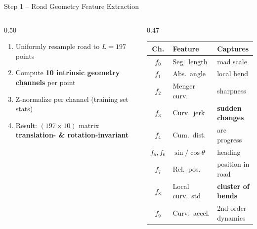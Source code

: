 \documentclass[aspectratio=169,10pt]{beamer}
\newcommand{\hl}[1]{\textcolor{mLightBrown}{\textbf{#1}}}
\begin{document}
\begin{frame}{Step 1 -- Road Geometry Feature Extraction}
  \begin{columns}[T]
    \begin{column}{0.50\linewidth}
      \begin{enumerate}
        \item Uniformly resample road to $L{=}197$ points
        \item Compute \textbf{10 intrinsic geometry channels} per point
        \item Z-normalize per channel (training set stats)
        \item Result: $(197{\times}10)$ matrix\\
              \textbf{translation- \& rotation-invariant}
      \end{enumerate}
    \end{column}
    \begin{column}{0.47\linewidth}
      \small
      \begin{tabular}{@{}cll@{}}
        \toprule
        \textbf{Ch.} & \textbf{Feature} & \textbf{Captures} \\
        \midrule
        $f_0$ & Seg.\ length    & road scale \\
        $f_1$ & Abs.\ angle     & local bend \\
        $f_2$ & Menger curv.    & sharpness \\
        $f_3$ & Curv.\ jerk     & \hl{sudden changes} \\
        $f_4$ & Cum.\ dist.     & arc progress \\
        $f_5,f_6$ & $\sin/\cos\theta$ & heading \\
        $f_7$ & Rel.\ pos.      & position in road \\
        $f_8$ & Local curv.\ std & \hl{cluster of bends} \\
        $f_9$ & Curv.\ accel.   & 2nd-order dynamics \\
        \bottomrule
      \end{tabular}
    \end{column}
  \end{columns}
\end{frame}
\end{document}
